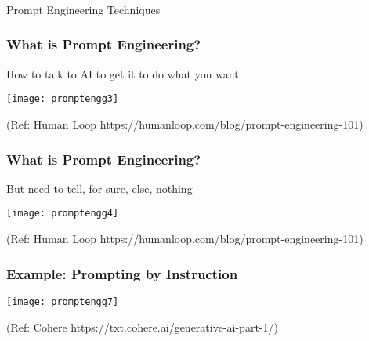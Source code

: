 
\begin{frame}[fragile]\frametitle{}
\begin{center}
{\Large Prompt Engineering Techniques}
\end{center}
\end{frame}


\begin{frame}[fragile]\frametitle{What is Prompt Engineering?}

How to talk to AI to get it to do what you want


\begin{center}
\texttt{[image: promptengg3]}

{\tiny (Ref: Human Loop https://humanloop.com/blog/prompt-engineering-101)}

\end{center}				
			

\end{frame}

\begin{frame}[fragile]\frametitle{What is Prompt Engineering?}

But need to tell, for sure, else, nothing


\begin{center}
\texttt{[image: promptengg4]}

{\tiny (Ref: Human Loop https://humanloop.com/blog/prompt-engineering-101)}

\end{center}				

\end{frame}

\begin{frame}[fragile]\frametitle{Example: Prompting by Instruction}

\begin{center}
\texttt{[image: promptengg7]}

{\tiny (Ref: Cohere https://txt.cohere.ai/generative-ai-part-1/)}

\end{center}		

\end{frame}



